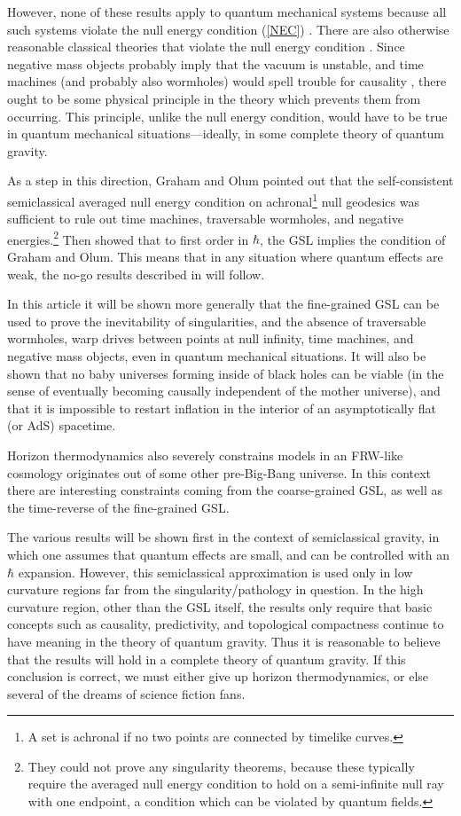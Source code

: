 \documentclass[12pt]{article}
\begin{document}
However, none of these results apply to quantum mechanical systems because all such systems violate the null energy condition (\ref{NEC}) \cite{neg}.  There are also otherwise reasonable classical theories that violate the null energy condition \cite{visser}.  Since negative mass objects probably imply that the vacuum is unstable, and time machines (and probably also wormholes) would spell trouble for causality \cite{noctc}, there ought to be some physical principle in the theory which prevents them from occurring.  This principle, unlike the null energy condition, would have to be true in quantum mechanical situations---ideally, in some complete theory of quantum gravity.

As a step in this direction, Graham and Olum \cite{GO} pointed out that the self-consistent semiclassical averaged null energy condition on achronal\footnote{A set is achronal if no two points are connected by timelike curves.} null geodesics was sufficient to rule out time machines, traversable wormholes, and negative energies.\footnote{They could not prove any singularity theorems, because these typically require the averaged null energy condition to hold on a semi-infinite null ray with one endpoint, a condition which can be violated by quantum fields.} Then \cite{anec} showed that to first order in $\hbar$, the GSL implies the condition of Graham and Olum.  This means that in any situation where quantum effects are weak, the no-go results described in \cite{GO} will follow.

In this article it will be shown more generally that the fine-grained GSL can be used to prove the inevitability of singularities, and the absence of traversable wormholes, warp drives between points at null infinity, time machines, and negative mass objects, even in quantum mechanical situations.  It will also be shown that no baby universes forming inside of black holes can be viable (in the sense of eventually becoming causally independent of the mother universe), and that it is impossible to restart inflation in the interior of an asymptotically flat (or AdS) spacetime.  

Horizon thermodynamics also severely constrains models in an FRW-like cosmology originates out of some other pre-Big-Bang universe.  In this context there are interesting constraints coming from the coarse-grained GSL, as well as the time-reverse of the fine-grained GSL. 

The various results will be shown first in the context of semiclassical gravity, in which one assumes that quantum effects are small, and can be controlled with an $\hbar$ expansion.  However, this semiclassical approximation is used only in low curvature regions far from the singularity/pathology in question.  In the high curvature region, other than the GSL itself, the results only require that basic concepts such as causality, predictivity, and topological compactness continue to have meaning in the theory of quantum gravity.  Thus it is reasonable to believe that the results will hold in a complete theory of quantum gravity.  If this conclusion is correct, we must either give up horizon thermodynamics, or else several of the dreams of science fiction fans.
\end{document}
